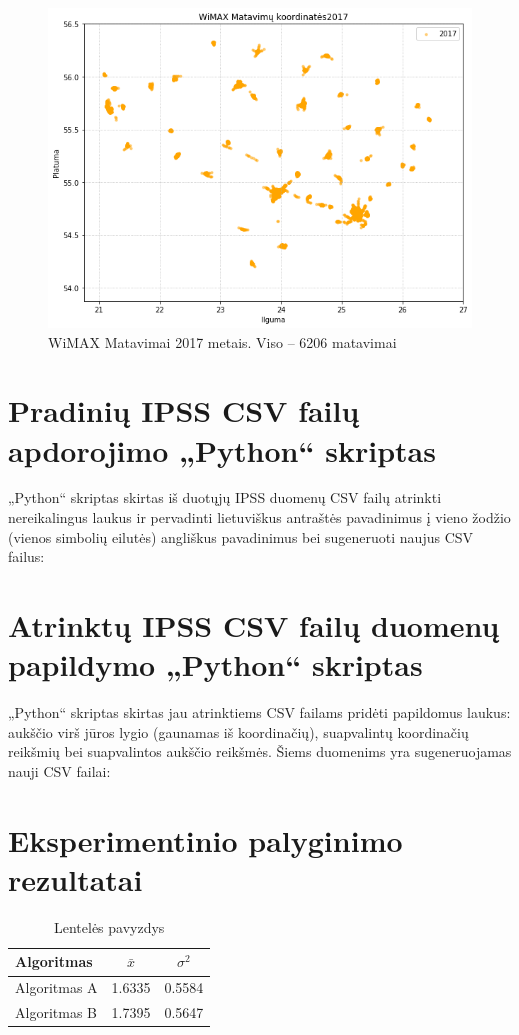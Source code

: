 \documentclass{VUMIFPSbakalaurinis}
\begin{document}
\begin{figure}[H]
	\centering
	\includegraphics[scale=0.33]{img/WiMAX-3}
	\caption{WiMAX Matavimai 2017 metais. Viso – 6206 matavimai}
	\label{img:WiMAX-3}
\end{figure}

\section{Pradinių IPSS CSV failų apdorojimo „Python“ skriptas} \label{script1}
„Python“ skriptas skirtas iš duotųjų IPSS duomenų CSV failų atrinkti nereikalingus laukus ir pervadinti lietuviškus antraštės pavadinimus į vieno žodžio (vienos simbolių eilutės) angliškus pavadinimus bei sugeneruoti naujus CSV failus:


\section{Atrinktų IPSS CSV failų duomenų papildymo „Python“ skriptas} \label{script2}
„Python“ skriptas skirtas jau atrinktiems CSV failams pridėti papildomus laukus: aukščio virš jūros lygio (gaunamas iš koordinačių), suapvalintų koordinačių reikšmių bei suapvalintos aukščio reikšmės. Šiems duomenims yra sugeneruojamas nauji CSV failai:




\section{Eksperimentinio palyginimo rezultatai}
\begin{table}[H]\footnotesize
	\centering
	\caption{Lentelės pavyzdys}
	{\begin{tabular}{|l|c|c|} \hline
			Algoritmas & $\bar{x}$ & $\sigma^{2}$ \\
			\hline
			Algoritmas A  & 1.6335    & 0.5584       \\
			Algoritmas B  & 1.7395    & 0.5647       \\
			\hline
	\end{tabular}}
	\label{tab:table example}
\end{table}
\end{document}
